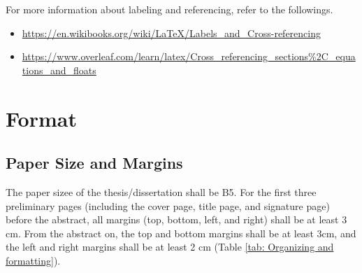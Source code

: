 \documentclass{report}
\begin{document}
For more information about labeling and referencing, refer to the followings.
\begin{itemize}
\item
\url{https://en.wikibooks.org/wiki/LaTeX/Labels_and_Cross-referencing}
\item
\url{https://www.overleaf.com/learn/latex/Cross_referencing_sections%2C_equations_and_floats}
\end{itemize}

\chapter{Format}\label{chap:organizing}

\section{Paper Size and Margins} \label{sec:papersize}
The paper sizee of the thesis/dissertation shall be B5.
For the first three preliminary pages (including the cover page, title page, and signature page) before the abstract, all margins (top, bottom, left, and right) shall be at least 3 cm.
From the abstract on, the top and bottom margins shall be at least 3cm, and the left and right margins shall be at least 2 cm (Table \ref{tab: Organizing and formatting}).
\bigskip
\end{document}
